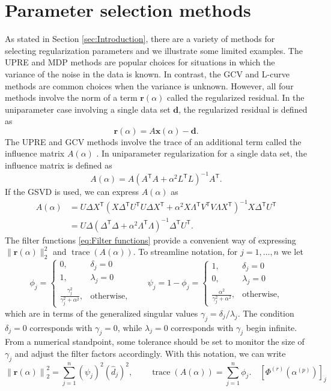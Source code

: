 \documentclass[12pt]{article}
\newcommand{\dVec}{\mathbf{d}}	%
\newcommand{\rVec}{\mathbf{r}}	%
\newcommand{\xVec}{\mathbf{x}}	%
\newcommand{\trans}[1]{{#1}^\mathsf{T}}	%
\newcommand{\inv}[1]{{#1}^{-1}}	%
\DeclareMathOperator{\trace}{trace}		%
\newcommand{\dft}[1]{\widehat{#1}}	%
\newcommand{\regparam}{\alpha}  %
\newcommand{\xReg}{\xVec(\regparam)}	%
\newcommand{\filt}{\phi}
\newcommand{\mfilt}{\psi}
\newcommand{\rReg}{\rVec(\regparam)}	%
\newcommand{\A}{A(\regparam)}	%
\begin{document}
\section{Parameter selection methods} \label{sec:Methods}
As stated in Section \ref{sec:Introduction}, there are a variety of methods for selecting regularization parameters and we illustrate some limited examples. The UPRE and MDP methods are popular choices for situations in which the variance of the noise in the data is known. In contrast, the GCV and L-curve methods are common choices when the variance is unknown. However, all four methods involve the norm of a term $\rReg$ called the regularized residual. In the uniparameter case involving a single data set $\dVec$, the regularized residual is defined as
\begin{equation}
\label{eq:Regularized Residual}
\rReg = A\xReg - \dVec.
\end{equation}
The UPRE and GCV methods involve the trace of an additional term called the influence matrix $\A$ \cite[p.~98]{Vogel:2002}. In uniparameter regularization for a single data set, the influence matrix is defined as
\begin{equation}
    \label{eq:Influence matrix}
    \A = A\inv{\left(\trans{A}A + \regparam^2\trans{L}L\right)}\trans{A}.
\end{equation}
If the GSVD is used, we can express $\A$ as
\begin{align*}
    \A &= U\Delta\trans{X}\inv{\left(X\trans{\Delta}\trans{U}U\Delta\trans{X} + \regparam^2 X\trans{\Lambda}\trans{V}V\Lambda\trans{X}\right)}X\trans{\Delta}\trans{U} \\
    &= U\Delta\inv{\left(\trans{\Delta}\Delta + \regparam^2 \trans{\Lambda}\Lambda\right)}\trans{\Delta}\trans{U}.
\end{align*}
The filter functions \eqref{eq:Filter functions} provide a convenient way of expressing $\|\rReg\|_2^2$ and $\trace(\A)$. To streamline notation, for $j = 1,\ldots,n$ we let
\[\filt_j = \begin{cases}
0, & \delta_j = 0 \\
1, & \lambda_j = 0 \\
\frac{\gamma_j^2}{\gamma_j^2 + \regparam^2}, & \text{otherwise,}
\end{cases} \qquad \mfilt_j = 1 - \filt_j = \begin{cases}
1, & \delta_j = 0 \\
0, & \lambda_j = 0 \\
\frac{\regparam^2}{\gamma_j^2 + \regparam^2}, & \text{otherwise,}
\end{cases}\]
which are in terms of the generalized singular values $\gamma_j = \delta_j/\lambda_j$. The condition $\delta_j = 0$ corresponds with $\gamma_j = 0$, while $\lambda_j = 0$ corresponds with $\gamma_j$ begin infinite. From a numerical standpoint, some tolerance should be set to monitor the size of $\gamma_j$ and adjust the filter factors accordingly. With this notation, we can write
\[\left\|\rReg\right\|_2^2 = \sum_{j=1}^{n} \left(\mfilt_j\right)^2\left(\dft{d}_j\right)^2, \qquad \trace(\A) = \sum_{j=1}^{n} \filt_j. \quad \left[\Phi^{(r)}(\regparam^{(p)})\right]_j\]
\end{document}
